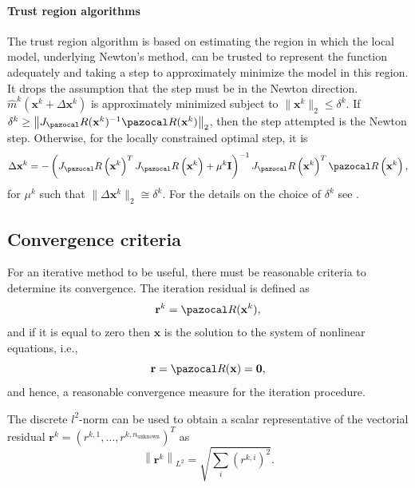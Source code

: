 \paragraph{Trust region algorithms}

The trust region algorithm is based on estimating the region in which the local model, underlying Newton's method, can be trusted to represent the function adequately and taking a step to approximately minimize the model in this region.
It drops the assumption that the step must be in the Newton direction.
\(\hat{m}^k(\mathbf x^k+\Delta \mathbf x^k)\) is approximately minimized subject to \(\|\mathbf x^k\|_{2} \leq \delta^k\).
If \(\delta^k \geq\left\|J_\pazocal R(\mathbf x^k)^{-1} \pazocal R(\mathbf x^k)\right\|_{2}\), then the step attempted is the Newton step.
Otherwise, for the locally constrained optimal step, it is
\begin{equation}
  \Delta \mathbf x^k=-\left(J_\pazocal R\left(\mathbf x^k\right)^{T} J_\pazocal R\left(\mathbf x^k\right)+\mu^k \mathbf I\right)^{-1} J_\pazocal R\left(\mathbf x^k\right)^{T} \pazocal R\left(\mathbf x^k\right),
\end{equation}
for \(\mu^k\) such that \(\|\Delta \mathbf x^k\|_{2} \cong \delta^k\).
For the details on the choice of \(\delta^k\) see \cite{dennis_numerical_1996}.


\subsection{Convergence criteria}

For an iterative method to be useful, there must be reasonable criteria to determine its convergence.
The iteration residual is defined as
\begin{equation}
\mathbf r^{k} = \pazocal R(\mathbf x^{k}),
\end{equation}
and if it is equal to zero then $\mathbf x$ is the solution to the system of nonlinear equations, i.e.,
\begin{equation} \label{eq:residual_definition}
\mathbf r = \pazocal R(\mathbf x) = \mathbf 0,
\end{equation}
and hence, a reasonable convergence measure for the iteration procedure.

The discrete  $l^{2}$-norm can be used to obtain a scalar representative of the vectorial residual \(\mathbf r^{k}=\left(r^{k,1}, \ldots, r^{k,n_\text{unknown}}\right)^{T}\) as
\begin{equation} \label{eq:absolute_residual_criterion}
\left\|\mathbf{r}^{k}\right\|_{L^{2}}=\sqrt{\sum_{i}\left(r^{k, i}\right)^{2}}.
\end{equation}

